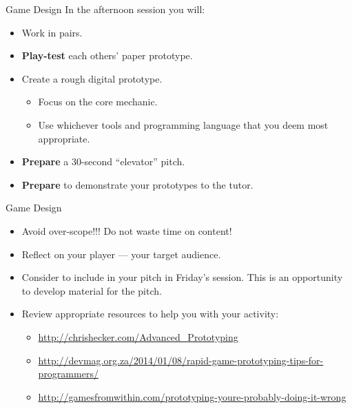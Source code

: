 \documentclass[xcolor={dvipsnames}]{beamer}\usepackage{etoolbox}\newtoggle{printable}\togglefalse{printable}
\begin{document}
\begin{frame}{Game Design}
	In the afternoon session you will:
	
	\begin{itemize}
		\item Work in pairs.
		\item \textbf{Play-test} each others' paper prototype.
		\item {Create} a rough digital prototype.
		\begin{itemize}
			\item Focus on the core mechanic.
			\item Use whichever tools and programming language that you deem most appropriate.
		\end{itemize}
		\item \textbf{Prepare} a 30-second ``elevator'' pitch.
		\item \textbf{Prepare} to demonstrate your prototypes to the tutor.
	\end{itemize}
\end{frame}

\begin{frame}{Game Design}
	\begin{itemize}
		\item Avoid over-scope!!! Do not waste time on content!
		\item Reflect on your player --- your target audience.
		\item Consider to include in your pitch in Friday’s session. This is an opportunity to develop material for the pitch.
		\item Review appropriate resources to help you with your activity:
		\begin{itemize}
			\item \url{http://chrishecker.com/Advanced_Prototyping}
			\item \url{http://devmag.org.za/2014/01/08/rapid-game-prototyping-tips-for-programmers/}
			\item \url{http://gamesfromwithin.com/prototyping-youre-probably-doing-it-wrong}
		\end{itemize}
	\end{itemize}
\end{frame}


%
\end{document}
